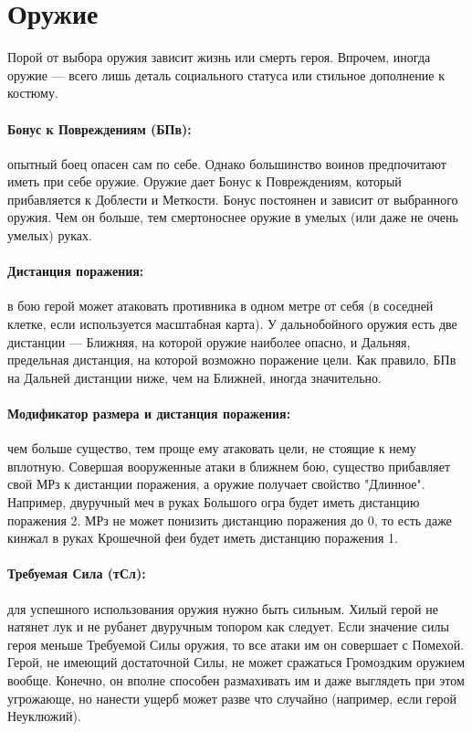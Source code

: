 \section{Оружие}
Порой от выбора оружия зависит жизнь или смерть героя. Впрочем, иногда оружие — всего лишь деталь социального статуса или стильное дополнение к костюму.
\paragraph{Бонус к Повреждениям (БПв):} опытный боец опасен сам по себе. Однако большинство воинов предпочитают иметь при себе оружие. Оружие дает Бонус к Повреждениям, который прибавляется к Доблести и Меткости. Бонус постоянен и зависит от выбранного оружия. Чем он больше, тем смертоноснее оружие в умелых (или даже не очень умелых) руках.
\paragraph{Дистанция поражения:} в бою герой может атаковать противника в одном метре от себя (в соседней клетке, если используется масштабная карта). У дальнобойного оружия есть две дистанции — Ближняя, на которой оружие наиболее опасно, и Дальняя, предельная дистанция, на которой возможно поражение цели. Как правило, БПв на Дальней дистанции ниже, чем на Ближней, иногда значительно.
\paragraph{Модификатор размера и дистанция поражения:} чем больше существо, тем проще ему атаковать цели, не стоящие к нему вплотную. Совершая вооруженные атаки в ближнем бою, существо прибавляет свой МРз к дистанции поражения, а оружие получает свойство "Длинное". Например, двуручный меч в руках Большого огра будет иметь дистанцию поражения 2. МРз не может понизить дистанцию поражения до 0, то есть даже кинжал в руках Крошечной феи будет иметь дистанцию поражения 1.
\paragraph{Требуемая Сила (тСл):} для успешного использования оружия нужно быть сильным. Хилый герой не натянет лук и не рубанет двуручным топором как следует. 
\newline
Если значение силы героя меньше Требуемой Силы оружия, то все атаки им он совершает с Помехой. Герой, не имеющий достаточной Силы, не может сражаться Громоздким оружием вообще. Конечно, он вполне способен размахивать им и даже выглядеть при этом угрожающе, но нанести ущерб может разве что случайно (например, если герой Неуклюжий).

